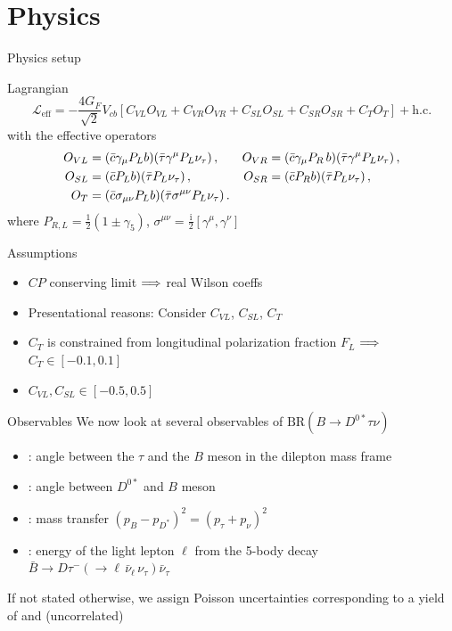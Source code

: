 \section{Physics}

\begin{frame}{Physics setup}
	\begin{block}{Lagrangian}
	\begin{equation*}\label{eq:Lbc}
	\mathcal{L}_\text{eff} = -\frac{4G_F}{\sqrt{2}}V_{cb}\left[C_{VL}O_{VL}+C_{VR}O_{VR}+C_{SL}O_{SL}+C_{SR}O_{SR}+C_{T}O_{T}\right]+\text{h.c.}
	\end{equation*}
	with the effective operators
	\begin{align*}
	O_{VL}&= (\bar c \gamma_\mu P_L b)(\bar \tau \gamma^\mu P_L \nu_\tau)\,, &  O_{VR}&= (\bar c \gamma_\mu P_R \,b)(\bar \tau \gamma^\mu P_L \nu_\tau)\,,\notag\\
	O_{SL}&= (\bar c P_L b)(\bar \tau  P_L \nu_\tau)\,,& O_{SR}&= (\bar c  P_R b)(\bar \tau  P_L \nu_\tau)\,, \\
	O_{T}&= (\bar c \sigma_{\mu\nu} P_L b)(\bar \tau \sigma^{\mu\nu} P_L \nu_\tau)\,. &\notag
	\end{align*} 
	where $P_{R,L}=\frac{1}{2}(1\pm\gamma_5)$, $\sigma^{\mu\nu}=\frac{\mathrm i}{2}[\gamma^\mu,\gamma^\nu]$
	
	\end{block}
	\begin{block}{Assumptions}
	\begin{itemize}
		\item $CP$ conserving limit $\Longrightarrow$ real Wilson coeffs
		\item Presentational reasons: Consider $C_{VL}$, $C_{SL}$, $C_T$
		\item $C_T$ is constrained from longitudinal polarization fraction $F_L$ $\Longrightarrow$ $C_T\in [-0.1, 0.1]$
		\item $C_{VL}, C_{SL}\in [-0.5, 0.5]$
	\end{itemize}
	\end{block}
\end{frame}

\begin{frame}{Observables}
	We now look at several observables of $\mathrm{BR}(B\to D^{0*} \tau\nu)$
	\begin{itemize}
		\item \hhl{$\theta_\tau$}: angle between the $\tau$ and the $B$ meson in the dilepton mass frame
		\item {}: angle between $D^{0*}$ and $B$ meson
		\item {}: mass transfer $(p_B-p_{D^*})^2=(p_\tau+p_\nu)^2$
		\item {}: energy of the light lepton $\ell$ from the 5-body decay $\bar B\to D \tau^-(\to\ell\, \bar\nu_\ell\,\nu_\tau)\bar\nu_\tau$
	\end{itemize}

	If not stated otherwise, we assign Poisson uncertainties corresponding to a yield of  and  (uncorrelated)
\end{frame}

